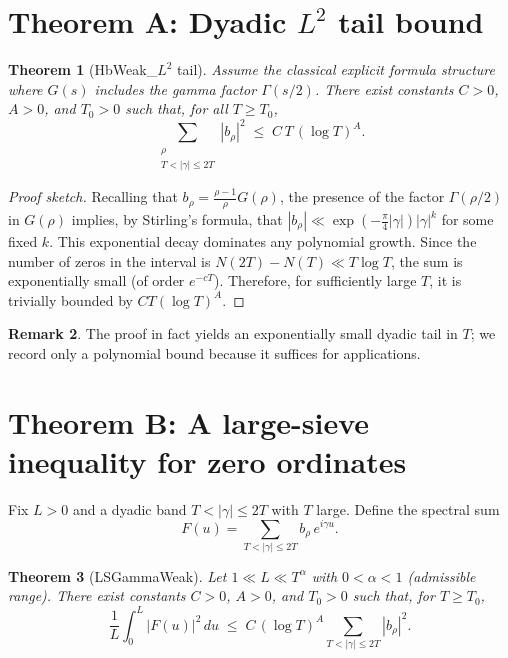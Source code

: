 \documentclass[11pt]{article}
\theoremstyle{plain}
\newtheorem{theorem}{Theorem}[section]
\theoremstyle{definition}
\newtheorem{remark}[theorem]{Remark}
\begin{document}
\section{Theorem A: Dyadic $L^2$ tail bound}
\begin{theorem}[HbWeak\_{$L^2$} tail]\label{thm:A}
Assume the classical explicit formula structure where $G(s)$ includes the gamma factor $\Gamma(s/2)$. There exist constants $C>0$, $A>0$, and $T_0>0$ such that, for all $T \ge T_0$,
\[
  \sum_{\substack{\rho \\ T < |\gamma| \le 2T}} |b_\rho|^2 \;\le\; C\, T\, (\log T)^A.
\]
\end{theorem}

\begin{proof}[Proof sketch]
Recalling that $b_\rho = \frac{\rho-1}{\rho} G(\rho)$, the presence of the factor $\Gamma(\rho/2)$ in $G(\rho)$ implies, by Stirling's formula, that $|b_\rho| \ll \exp(-\frac{\pi}{4}|\gamma|) |\gamma|^{k}$ for some fixed $k$. This exponential decay dominates any polynomial growth. Since the number of zeros in the interval is $N(2T)-N(T) \ll T \log T$, the sum is exponentially small (of order $e^{-cT}$). Therefore, for sufficiently large $T$, it is trivially bounded by $C T (\log T)^A$.
\end{proof}
\begin{remark}
The proof in fact yields an exponentially small dyadic tail in $T$; we record only a polynomial bound because it suffices for applications.
\end{remark}

\section{Theorem B: A large-sieve inequality for zero ordinates}
Fix $L>0$ and a dyadic band $T<|\gamma|\le 2T$ with $T$ large. Define the spectral sum
\[
  F(u) = \sum_{T<|\gamma|\le 2T} b_\rho\, e^{i\gamma u}.
\]

\begin{theorem}[LSGammaWeak]\label{thm:B}
Let $1 \ll L \ll T^\alpha$ with $0<\alpha<1$ (admissible range). There exist constants $C>0$, $A>0$, and $T_0>0$ such that, for $T \ge T_0$,
\[
  \frac{1}{L} \int_0^L |F(u)|^2 \, du
    \;\le\; C\,(\log T)^A \sum_{T<|\gamma|\le 2T} |b_\rho|^2.
\]
\end{theorem}
\end{document}
